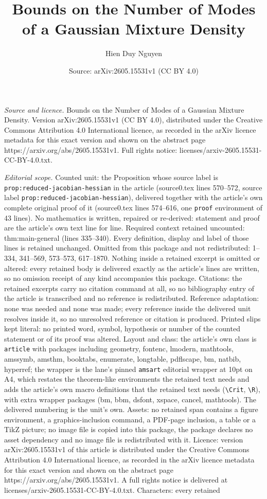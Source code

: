 \documentclass[10pt,a4paper]{amsart}
\title[Bounds on the Number of Modes of a Gaussian Mixture Density]{Bounds on the Number of Modes of a Gaussian Mixture Density}
\author{Hien Duy Nguyen}
\date{Source: arXiv:2605.15531v1 (CC BY 4.0)}
\begin{document}
\maketitle

\noindent\emph{Source and licence.} Bounds on the Number of Modes of a Gaussian Mixture Density. Version arXiv:2605.15531v1 (CC BY 4.0), distributed under the Creative Commons Attribution 4.0 International licence, as recorded in the arXiv licence metadata for this exact version and shown on the abstract page https://arxiv.org/abs/2605.15531v1. Full rights notice: licenses/arxiv-2605.15531-CC-BY-4.0.txt.\par\smallskip

\noindent\textit{Editorial scope.} Counted unit: the Proposition whose source label is \texttt{prop:reduced-jacobian-hessian} in the article (source0.tex lines 570--572, source label \texttt{prop:reduced-jacobian-hessian}), delivered together with the article's own complete original proof of it (source0.tex lines 574--616, one \texttt{proof} environment of 43 lines). No mathematics is written, repaired or re-derived: statement and proof are the article's own text line for line. Required context retained uncounted: thm:main-general (lines 335--340). Every definition, display and label of those lines is retained unchanged. Omitted from this package and not redistributed: 1--334, 341--569, 573--573, 617--1870. Nothing inside a retained excerpt is omitted or altered: every retained body is delivered exactly as the article's lines are written, so no omission receipt of any kind accompanies this package. Citations: the retained excerpts carry no citation command at all, so no bibliography entry of the article is transcribed and no reference is redistributed. Reference adaptation: none was needed and none was made; every reference inside the delivered unit resolves inside it, so no unresolved reference or citation is produced. Printed slips kept literal: no printed word, symbol, hypothesis or number of the counted statement or of its proof was altered. Layout and class: the article's own class is \texttt{article} with packages including geometry, fontenc, lmodern, mathtools, amssymb, amsthm, booktabs, enumerate, longtable, pdflscape, bm, natbib, hyperref; the wrapper is the lane's pinned \texttt{amsart} editorial wrapper at 10pt on A4, which restates the theorem-like environments the retained text needs and adds the article's own macro definitions that the retained text needs (\texttt{\textbackslash Crit}, \texttt{\textbackslash R}), with extra wrapper packages (bm, bbm, dsfont, xspace, cancel, mathtools). The delivered numbering is the unit's own. Assets: no retained span contains a figure environment, a graphics-inclusion command, a PDF-page inclusion, a table or a TikZ picture; no image file is copied into this package, the package declares no asset dependency and no image file is redistributed with it. Licence: version arXiv:2605.15531v1 of this article is distributed under the Creative Commons Attribution 4.0 International licence, as recorded in the arXiv licence metadata for this exact version and shown on the abstract page https://arxiv.org/abs/2605.15531v1. A full rights notice is delivered at licenses/arxiv-2605.15531-CC-BY-4.0.txt. Characters: every retained 
\end{document}
